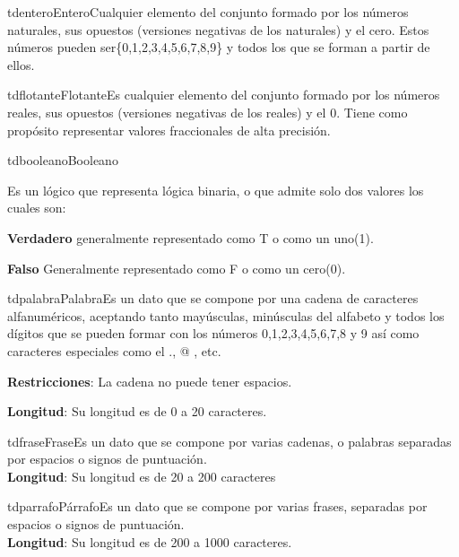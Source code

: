 \begin{TipoDeDato}{tdentero}{Entero}{Cualquier elemento del conjunto formado por los números naturales, sus opuestos (versiones negativas de los naturales) y el cero. Estos números pueden ser\{0,1,2,3,4,5,6,7,8,9\} y todos los que se forman a partir de ellos.}
\end{TipoDeDato}

\begin{TipoDeDato}{tdflotante}{Flotante}{Es cualquier elemento del conjunto formado por los números reales, sus opuestos (versiones negativas de los reales) y el 0. Tiene como propósito representar valores fraccionales de alta precisión.}
\end{TipoDeDato}

\begin{TipoDeDato}{tdbooleano}{Booleano}{Es un  lógico que representa lógica binaria, o que admite solo dos valores los cuales son:
		\begin{Citemize}
			\item \textbf{Verdadero} generalmente representado como T o como un uno(1).
			\item \textbf{Falso} Generalmente representado como F o como un cero(0).
		\end{Citemize}}
\end{TipoDeDato}

\begin{TipoDeDato}{tdpalabra}{Palabra}{Es un dato que se compone por una cadena de caracteres alfanuméricos, aceptando tanto mayúsculas, minúsculas del alfabeto y todos los dígitos que se pueden formar con los números 0,1,2,3,4,5,6,7,8 y 9 así como caracteres especiales como el ., @ , etc.}
	\begin{Citemize}
		\item \textbf{Restricciones}: La cadena no puede tener espacios.
		\item \textbf{Longitud}: Su longitud es de 0 a 20 caracteres.
	\end{Citemize}	
\end{TipoDeDato}
	
\begin{TipoDeDato}{tdfrase}{Frase}{Es un dato que se compone por varias cadenas, o palabras separadas por espacios o signos de puntuación.\\}
		\textbf{Longitud}: Su longitud es de 20 a 200 caracteres
\end{TipoDeDato}
	
	
\begin{TipoDeDato}{tdparrafo}{Párrafo}{Es un dato que se compone por varias frases, separadas por espacios o signos de puntuación.\\}
		 \textbf{Longitud}: Su longitud es de 200 a 1000 caracteres.
\end{TipoDeDato}
		
